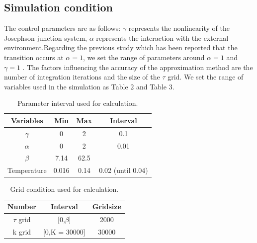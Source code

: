 \documentclass{article}[12pt]
\begin{document}
\begin{spacing}{1.5}
\subsection{Simulation condition}
The control parameters are as follows: $\gamma$ represents the nonlinearity of the Josephson junction system, 
$\alpha$ represents the interaction with the external environment.Regarding the previous study which has been reported 
that the transition occurs at $\alpha = 1$, we set the range of parameters around $\alpha = 1$ and $\gamma = 1$ . 
The factors influencing the accuracy of the approximation method are the number of integration iterations and the size of the $\tau$ grid. 
We set the range of variables used in the simulation as Table 2 and Table 3.
\begin{table}[htbp]
  \centering
  \renewcommand{\arraystretch}{1.2}  %
  \begin{tabular}{@{}cccc@{}}
  \toprule
  \textbf{Variables} & \textbf{Min} & \textbf{Max}  & \textbf{Interval}\\ 
  \midrule
  $\gamma$ & 0 & 2 & 0.1 \\
  $\alpha$ & 0 & 2 & 0.01 \\
  $\beta$ & 7.14 & 62.5 &  \\
  Temperature & 0.016 & 0.14 & 0.02 (until 0.04) \\
  \bottomrule
  \end{tabular}
  \caption{Parameter interval used for calculation.}
  \end{table}
\begin{table}[htbp]
  \centering
  \renewcommand{\arraystretch}{1.2}  %
  \begin{tabular}{@{}ccc@{}}
  \toprule
  \textbf{Number} & \textbf{Interval} & \textbf{Gridsize}\\ 
  \midrule
  $\tau$ grid & [0,$\beta$] & 2000 \\
  k grid & [0,K = 30000] & 30000 \\
  \bottomrule
  \end{tabular}
  \caption{Grid condition used for calculation.}
  \end{table}

\end{spacing}
\end{document}
